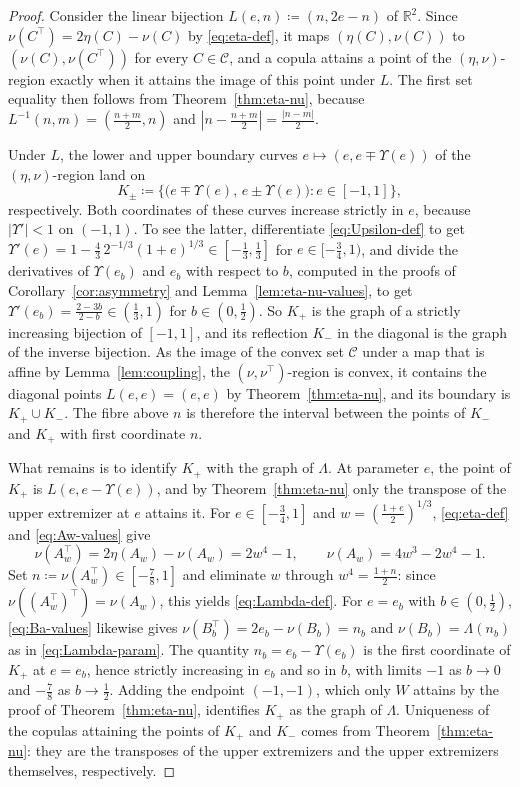 \documentclass[11pt,a4paper]{article}
\theoremstyle{remark}
\newcommand{\R}{\mathbb{R}}
\newcommand{\1}{\mathbf{1}}
\newcommand{\CC}{\mathcal{C}}
\begin{document}
\begin{proof}
Consider the linear bijection $L(e,n)\coloneqq(n,2e-n)$ of $\R^2$.
Since $\nu(C^\top)=2\eta(C)-\nu(C)$ by \eqref{eq:eta-def}, it maps $(\eta(C),\nu(C))$ to $(\nu(C),\nu(C^\top))$ for every $C\in\CC$, and a copula attains a point of the $(\eta,\nu)$-region exactly when it attains the image of this point under $L$.
The first set equality then follows from Theorem~\ref{thm:eta-nu}, because $L^{-1}(n,m)=(\frac{n+m}{2},n)$ and $|n-\frac{n+m}{2}|=\frac{|n-m|}{2}$.

Under $L$, the lower and upper boundary curves $e\mapsto(e,e\mp\Upsilon(e))$ of the $(\eta,\nu)$-region land on
\[
  K_\pm\coloneqq\bigl\{\bigl(e\mp\Upsilon(e),\,e\pm\Upsilon(e)\bigr):e\in[-1,1]\bigr\},
\]
respectively.
Both coordinates of these curves increase strictly in $e$, because $|\Upsilon'|<1$ on $(-1,1)$.
To see the latter, differentiate \eqref{eq:Upsilon-def} to get $\Upsilon'(e)=1-\frac43\,2^{-1/3}(1+e)^{1/3}\in[-\frac13,\frac13]$ for $e\in[-\frac34,1)$, and divide the derivatives of $\Upsilon(e_b)$ and $e_b$ with respect to $b$, computed in the proofs of Corollary~\ref{cor:asymmetry} and Lemma~\ref{lem:eta-nu-values}, to get $\Upsilon'(e_b)=\frac{2-3b}{2-b}\in(\frac13,1)$ for $b\in(0,\frac12)$.
So $K_+$ is the graph of a strictly increasing bijection of $[-1,1]$, and its reflection $K_-$ in the diagonal is the graph of the inverse bijection.
As the image of the convex set $\CC$ under a map that is affine by Lemma~\ref{lem:coupling}, the $(\nu,\nu^\top)$-region is convex, it contains the diagonal points $L(e,e)=(e,e)$ by Theorem~\ref{thm:eta-nu}, and its boundary is $K_+\cup K_-$.
The fibre above $n$ is therefore the interval between the points of $K_-$ and $K_+$ with first coordinate $n$.

What remains is to identify $K_+$ with the graph of $\Lambda$.
At parameter $e$, the point of $K_+$ is $L(e,e-\Upsilon(e))$, and by Theorem~\ref{thm:eta-nu} only the transpose of the upper extremizer at $e$ attains it.
For $e\in[-\frac34,1]$ and $w=(\frac{1+e}{2})^{1/3}$, \eqref{eq:eta-def} and \eqref{eq:Aw-values} give
\[
  \nu(A_w^\top)=2\eta(A_w)-\nu(A_w)=2w^4-1,
  \qquad
  \nu(A_w)=4w^3-2w^4-1.
\]
Set $n\coloneqq\nu(A_w^\top)\in[-\frac78,1]$ and eliminate $w$ through $w^4=\frac{1+n}{2}$: since $\nu((A_w^\top)^\top)=\nu(A_w)$, this yields \eqref{eq:Lambda-def}.
For $e=e_b$ with $b\in(0,\frac12)$, \eqref{eq:Ba-values} likewise gives $\nu(B_b^\top)=2e_b-\nu(B_b)=n_b$ and $\nu(B_b)=\Lambda(n_b)$ as in \eqref{eq:Lambda-param}.
The quantity $n_b=e_b-\Upsilon(e_b)$ is the first coordinate of $K_+$ at $e=e_b$, hence strictly increasing in $e_b$ and so in $b$, with limits $-1$ as $b\to0$ and $-\frac78$ as $b\to\frac12$.
Adding the endpoint $(-1,-1)$, which only $W$ attains by the proof of Theorem~\ref{thm:eta-nu}, identifies $K_+$ as the graph of $\Lambda$.
Uniqueness of the copulas attaining the points of $K_+$ and $K_-$ comes from Theorem~\ref{thm:eta-nu}: they are the transposes of the upper extremizers and the upper extremizers themselves, respectively.
\end{proof}
\end{document}
